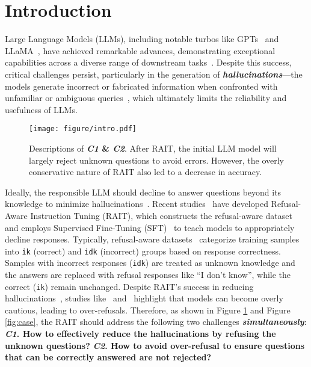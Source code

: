 \section{Introduction}
\label{sec:Introduction}
Large Language Models (LLMs), including notable turbos like GPTs~\cite{ChatGPT,OpenAI2023GPT4TR} and LLaMA~\cite{touvron2023llama,dubey2024llama}, have achieved remarkable advances, demonstrating exceptional capabilities across a diverse range of downstream tasks~\cite{kaplan2020scaling,vu2024gptvoicetasker,achiam2023gpt,bai2024rat,jiang2024hykge,jiang2024tc}. Despite this success, critical challenges persist, particularly in the generation of \textit{\textbf{hallucinations}}—the models generate incorrect or fabricated information when confronted with unfamiliar or ambiguous queries~\cite{ji2023survey,dont_hallucinate_abstain,kang2024unfamiliar}, which ultimately limits the reliability and usefulness of LLMs.

\begin{figure}[t]
    \centering
    \texttt{[image: figure/intro.pdf]}
    \caption{Descriptions of \textbf{\textit{C1} \& \textit{C2}}. After RAIT, the initial LLM model will largely reject unknown questions to avoid errors. However, the overly conservative nature of RAIT also led to a decrease in accuracy.}
    \label{fig:introduction}
\end{figure}


Ideally, the responsible LLM should decline to answer questions beyond its knowledge to minimize hallucinations~\cite{know_your_limits,survey_honesty}.
Recent studies~\cite{alignment_for_honesty, R_Tuning, rejection_improves, cheng2024can, bai2024efficient, zhu2024utilizeflowsteppingriver} have developed Refusal-Aware Instruction Tuning (RAIT), which constructs the refusal-aware dataset and employs Supervised Fine-Tuning (SFT)~\cite{dongabilities,Ouyang_Wu_Jiang_Almeida_Wainwright_Mishkin_Zhang_Agarwal_Slama_Ray_et,luo2024kuaiji} to teach models to appropriately decline responses.
Typically, refusal-aware datasets~\cite{R_Tuning,zhangdefending} categorize training samples into \texttt{ik} (correct) and \texttt{idk} (incorrect) groups based on response correctness. Samples with incorrect responses (\texttt{idk}) are treated as unknown knowledge and the answers are replaced with refusal responses like ``I don't know'', while the correct (\texttt{ik}) remain unchanged. Despite RAIT’s success in reducing hallucinations~\cite{R_Tuning,alignment_for_honesty,zhang2025amulet,wan2024mitigating}, studies like~\cite{varshney2023art} and~\cite{cheng2024can} highlight that models can become overly cautious, leading to over-refusals. 
Therefore, as shown in Figure \ref{fig:introduction} and Figure \ref{fig:case}, the RAIT should address the following two challenges \textit{\textbf{simultaneously}}:
\textbf{\textit{C1}. How to effectively reduce the hallucinations by refusing the unknown questions?}
\textbf{\textit{C2}. How to avoid over-refusal to ensure questions that can be correctly answered are not rejected?}

